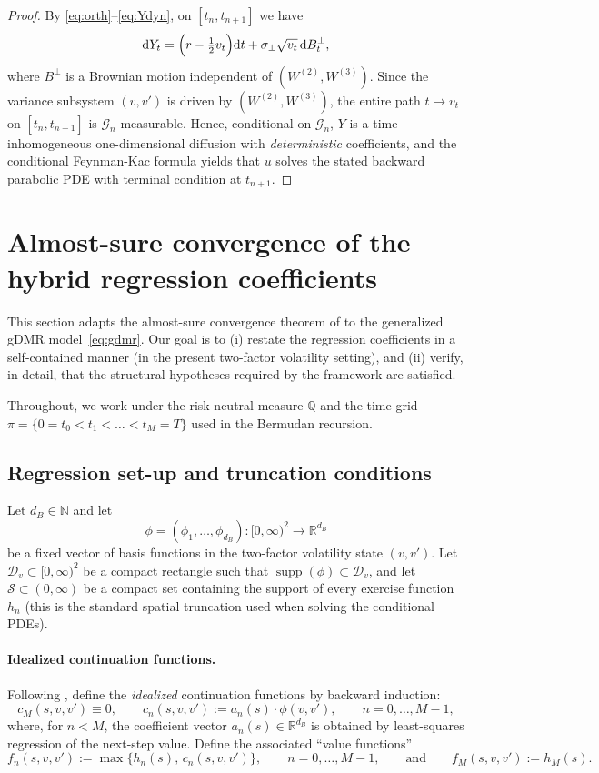 \documentclass[10pt]{article}
\theoremstyle{plain}
\theoremstyle{definition}
\theoremstyle{remark}
\newcommand{\dd}{\mathrm d}
\newcommand{\supp}{\operatorname{supp}}
\begin{document}
\begin{proof}
By \eqref{eq:orth}--\eqref{eq:Ydyn}, on $[t_n,t_{n+1}]$ we have
\[
\dd Y_t=\Bigl(r-\tfrac12 v_t\Bigr)\dd t+\sigma_\perp\sqrt{v_t}\,\dd B^\perp_t,
\]
where $B^\perp$ is a Brownian motion independent of $(W^{(2)},W^{(3)})$.
Since the variance subsystem $(v,v')$ is driven by $(W^{(2)},W^{(3)})$, the entire path
$t\mapsto v_t$ on $[t_n,t_{n+1}]$ is $\mathcal G_n$-measurable. Hence, conditional on $\mathcal G_n$,
$Y$ is a time-inhomogeneous one-dimensional diffusion with \emph{deterministic} coefficients, and the
conditional Feynman-Kac formula yields that $u$ solves the stated backward parabolic PDE with terminal
condition at $t_{n+1}$.
\end{proof}


\section{Almost-sure convergence of the hybrid regression coefficients}
\label{sec:as_convergence}

This section adapts the almost-sure convergence theorem of \citet{farahany2020mixing}
to the generalized gDMR model~\eqref{eq:gdmr}. Our goal is to (i) restate the regression coefficients
in a self-contained manner (in the present two-factor volatility setting), and (ii) verify, in detail,
that the structural hypotheses required by the \citet{farahany2020mixing} framework are satisfied.

Throughout, we work under the risk-neutral measure $\mathbb{Q}$ and the time grid
$\pi=\{0=t_0<t_1<\dots<t_M=T\}$ used in the Bermudan recursion.

\subsection{Regression set-up and truncation conditions}
\label{subsec:regression_truncation}

Let $d_B\in\mathbb{N}$ and let
\[
\phi = (\phi_1,\dots,\phi_{d_B}) : [0,\infty)^2 \to \mathbb{R}^{d_B}
\]
be a fixed vector of basis functions in the two-factor volatility state $(v,v')$.
Let $\mathcal{D}_v\subset [0,\infty)^2$ be a compact rectangle such that $\supp(\phi)\subset \mathcal{D}_v$,
and let $\mathcal{S}\subset (0,\infty)$ be a compact set containing the support of every exercise function
$h_n$ (this is the standard spatial truncation used when solving the conditional PDEs).

\paragraph{Idealized continuation functions.}
Following \citet{farahany2020mixing}, define the \emph{idealized} continuation functions by backward
induction:
\[
c_M(s,v,v') \equiv 0,\qquad
c_n(s,v,v') := a_n(s)\cdot \phi(v,v'),\qquad n=0,\dots,M-1,
\]
where, for $n<M$, the coefficient vector $a_n(s)\in\mathbb{R}^{d_B}$ is obtained by least-squares regression
of the next-step value.
Define the associated ``value functions''
\[
f_n(s,v,v') := \max\{h_n(s),\,c_n(s,v,v')\},\qquad n=0,\dots,M-1,
\qquad\text{and}\qquad
f_M(s,v,v') := h_M(s).
\]
\end{document}
